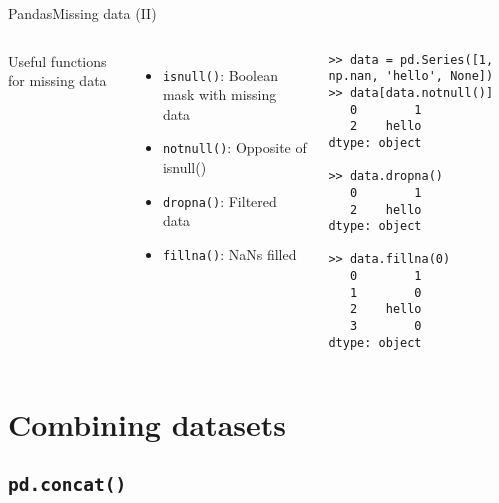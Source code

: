 \documentclass[10pt,compress]{beamer} %
\begin{document}
\begin{frame}[fragile]{Pandas}{Missing data (II)}
	\begin{columns}
		Useful functions for missing data
		\begin{itemize}
			\item \texttt{isnull()}: Boolean mask with missing data
			\item \texttt{notnull()}: Opposite of isnull()
			\item \texttt{dropna()}: Filtered data
			\item \texttt{fillna()}: NaNs filled
		\end{itemize}

		\begin{exampleblock}{}
		\vspace{-0.2cm} 
			\begin{lstlisting}
>> data = pd.Series([1, np.nan, 'hello', None])
>> data[data.notnull()]
   0        1
   2    hello
dtype: object

>> data.dropna()
   0        1
   2    hello
dtype: object

>> data.fillna(0)
   0        1
   1        0
   2    hello
   3        0
dtype: object
\end{lstlisting}
			\vspace{-0.2cm} 
		\end{exampleblock}
	\end{columns}
\end{frame}

\section{Combining datasets}
\subsection{\texttt{pd.concat()}}
\end{document}
